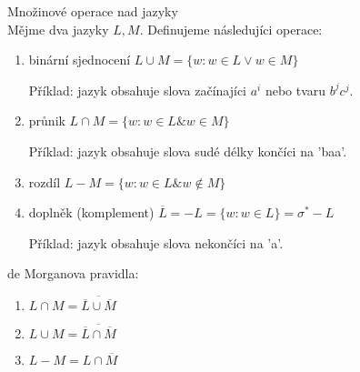 \documentclass[../main.tex]{subfiles}
\begin{document}
\begin{definition}
    Množinové operace nad jazyky\\

    Mějme dva jazyky $L,M$. Definujeme následujíci operace:
    \begin{enumerate}
        \item binární sjednocení $L\cup M = \{w: w\in L \lor w \in M\}$
        \begin{remark}
            Příklad: jazyk obsahuje slova začínajíci $a^i$ nebo tvaru $b^j c^j$.
        \end{remark}
        \item průnik $L\cap M = \{w: w\in L \& w\in M\}$
        \begin{remark}
            Příklad: jazyk obsahuje slova sudé délky končíci na 'baa'.    
        \end{remark}
        \item rozdíl $L - M = \{w: w\in L \& w \notin M\}$
        \item doplněk (komplement) $\overline{L} = -L = \{w: w\in L\} = \sigma^* -L$
        \begin{remark}
            Příklad: jazyk obsahuje slova nekončíci na 'a'.
        \end{remark}
    \end{enumerate}
\end{definition}
\begin{theorem}
    de Morganova pravidla:
    \begin{enumerate}
        \item $L\cap M = \overline{\overline{L}\cup \overline{M}}$
        \item $L\cup M = \overline{\overline{L}\cap \overline{M}}$
        \item $L - M = L \cap \overline{M}$
    \end{enumerate}
\end{theorem}
\end{document}
